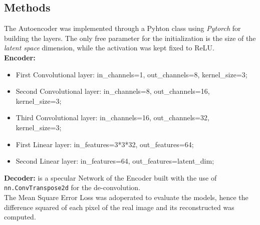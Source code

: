 \documentclass[11pt,a4paper,twocolumn]{IEEEtran}
\begin{document}
		\subsection{\textbf{Methods}}
		The Autoencoder was implemented through a Pyhton class using \textit{Pytorch} for building the layers. The only free parameter for the initialization is the size of the \textit{latent space} dimension, while the activation was kept fixed to ReLU.\medskip\\
		\textbf{Encoder:}
		\begin{itemize}
			\item First Convolutional layer: in\_channels=1, out\_channels=8, kernel\_size=3;
			\item Second Convolutional layer: in\_channels=8, out\_channels=16, kernel\_size=3;
			\item Third Convolutional layer: in\_channels=16, out\_channels=32, kernel\_size=3;
			\item First Linear layer: in\_features=3*3*32, out\_features=64;
			\item Second Linear layer: in\_features=64, out\_features=latent\_dim;
		\end{itemize}
		\textbf{Decoder:} is a specular Network of the Encoder built with the use of \texttt{nn.ConvTranspose2d} for the de-convolution.\\
		The Mean Square Error Loss was adoperated to evaluate the models, hence the difference squared of each pixel of the real image and its reconstructed was computed.
\end{document}
